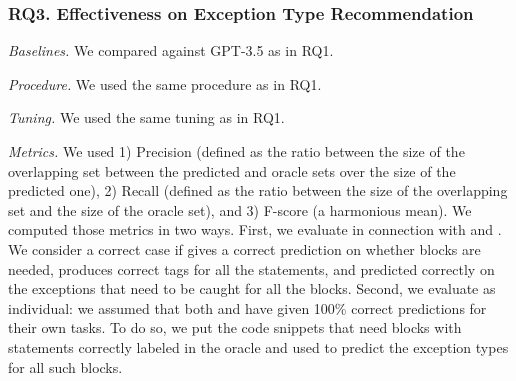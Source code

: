 \subsubsection{RQ3. Effectiveness on Exception Type Recommendation}

{\em Baselines.} We compared {\xtype} against GPT-3.5 as in RQ1.



{\em Procedure.} We used the same procedure as in RQ1.


{\em Tuning.} We used the same tuning as in RQ1.

{\em Metrics.} We used 1) Precision (defined as the ratio between the
size of the overlapping set between the predicted and oracle sets over
the size of the predicted one), 2) Recall (defined as the ratio
between the size of the overlapping set and the size of the oracle
set), and 3) F-score (a harmonious mean). We computed those metrics in
two ways. First, we evaluate {\xtype} in connection with {\xblock} and
{\xstate}. We consider a correct case if {\xblock} gives a correct
prediction on whether  blocks are needed, {\xstate}
produces correct tags for all the statements, and {\xtype} predicted
correctly on the exceptions that need to be caught for all
the  blocks.  Second, we evaluate {\xtype} as
individual: we assumed that both {\xblock} and {\xstate} have given
100\% correct predictions for their own tasks. To do so, we put the
code snippets that need  blocks with statements
correctly labeled in the oracle and used {\xtype} to predict the
exception types for all such blocks.

